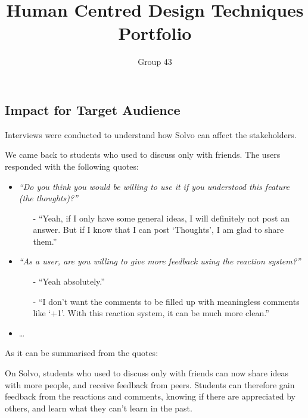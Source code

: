 \documentclass[a4paper]{article}
\begin{document}
    \title{
        \vspace{-3em}
        Human Centred Design Techniques Portfolio}
    \author{
        Group 43
    }
    \date{\vspace{-2em}}
    \maketitle

    \subsection*{Impact for Target Audience}

    Interviews were conducted to understand how Solvo can affect the stakeholders.

    We came back to students who used to discuss only with friends.
    The users responded with the following quotes:
    \begin{itemize}
        \item \textit{``Do you think you would be willing to use it if you understood this feature (the thoughts)?''}
        \begin{itemize}
            \item[-] ``Yeah, if I only have some general ideas, I will definitely not post an answer.
            But if I know that I can post `Thoughts', I am glad to share them.''
        \end{itemize}

        \item
        \textit{``As a user, are you willing to give more feedback using the reaction system?''}
        \begin{itemize}
            \item[-] ``Yeah absolutely.''
            \item[-] ``I don’t want the comments to be filled up with meaningless comments like `+1'.
            With this reaction system, it can be much more clean.''
        \end{itemize}
        \item \ldots
    \end{itemize}

    As it can be summarised from the quotes:

    On Solvo, students who used to discuss only with friends can now share ideas with more people, and receive feedback from peers.
    Students can therefore gain feedback from the reactions and comments, knowing if there are appreciated by others,
    and learn what they can't learn in the past.
\end{document}
